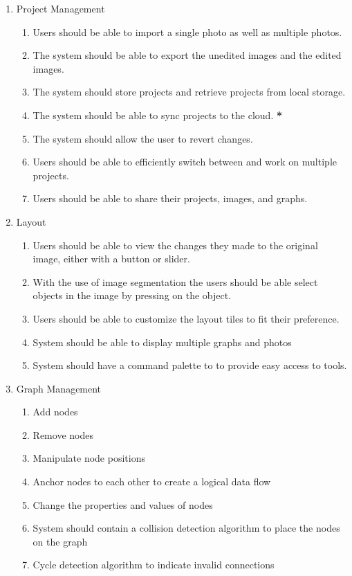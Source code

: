 \documentclass[11pt,a4paper]{article}
\begin{document}
\begin{enumerate}[label=\arabic*.]
    \item Project Management
    \begin{enumerate}[label*=\arabic*.]
        \item Users should be able to import a single photo as well as multiple photos. 
        \item The system should be able to export the unedited images and the edited images.
        \item The system should store projects and retrieve projects from local storage.
        \item The system should be able to sync projects to the cloud. \textbf{*}
        \item The system should allow the user to revert changes.
        \item Users should be able to efficiently switch between and work on multiple projects.
        \item Users should be able to share their projects, images, and graphs.
    \end{enumerate}
    
    \item Layout
    \begin{enumerate}[label*=\arabic*.]
        \item Users should be able to view the changes they made to the original image,
        either with a button or slider.
        \item With the use of image segmentation the users should be able select
        objects in the image by pressing on the object.
        \item Users should be able to customize the layout tiles to fit their preference.
        \item System should be able to display multiple graphs and photos
        \item System should have a command palette to to provide easy access to tools.
    \end{enumerate}

    \item Graph Management
    \begin{enumerate}[label*=\arabic*.]
        \item Add nodes
        \item Remove nodes
        \item Manipulate node positions
        \item Anchor nodes to each other to create a logical data flow
        \item Change the properties and values of nodes
        \item System should contain a collision detection algorithm to
        place the nodes on the graph
        \item Cycle detection algorithm to indicate invalid connections
    \end{enumerate}


\end{enumerate}
\end{document}
